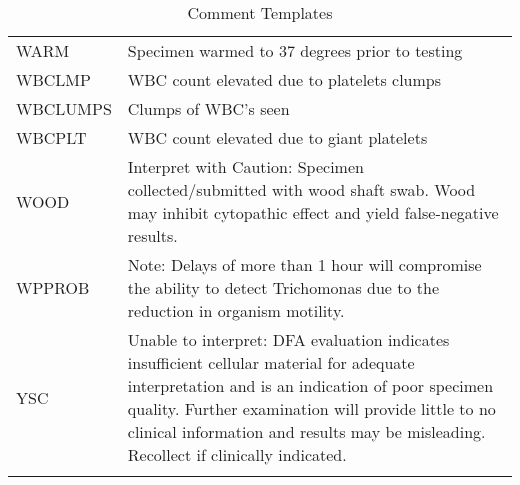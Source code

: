 \begin{fullwidth}
\begin{longtable}{p{.20\linewidth} p{.75\linewidth}}
WARM         & Specimen warmed to 37 degrees prior to testing\\
WBCLMP       & WBC count elevated due to platelets clumps\\
WBCLUMPS     & Clumps of WBC's seen\\
WBCPLT       & WBC count elevated due to giant platelets\\
WOOD         & Interpret with Caution: Specimen collected/submitted with wood shaft swab. Wood may inhibit cytopathic effect and yield false-negative results.\\
WPPROB       & Note: Delays of more than 1 hour will compromise the ability to detect Trichomonas due to the reduction in organism motility.\\
YSC          & Unable to interpret: DFA evaluation indicates insufficient cellular material for adequate interpretation and is an indication of poor specimen quality. Further examination will provide little to no clinical information and results may be misleading. Recollect if clinically indicated.\\

\hline
\caption{Comment Templates}\label{table:comment_templates}
\end{longtable}
\end{fullwidth}